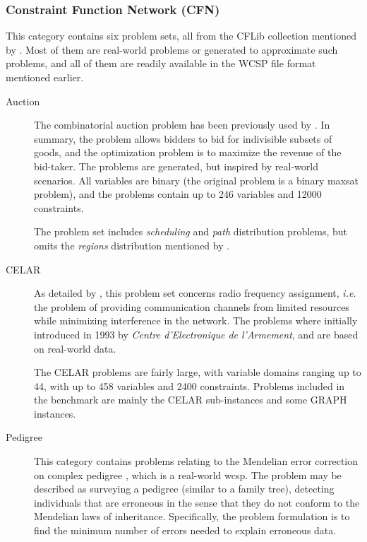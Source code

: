 \subsubsection{Constraint Function Network (CFN)}
This category contains six problem sets, all from the CFLib collection mentioned by \textcite[\pno~3]{deGivry14}.
Most of them are real-world problems or generated to approximate such problems, and all of them are readily available in the \textsc{WCSP} file format mentioned earlier.

\begin{description}
	\item[Auction]
		The combinatorial auction problem has been previously used by \textcites{Larrosa08}{Sandholm99}.
		In summary, the problem allows bidders to bid for indivisible subsets of goods, and the optimization problem is to maximize the revenue of the bid-taker.
		The problems are generated, but inspired by real-world scenarios.
		All variables are binary (the original problem is a binary \gls{maxsat} problem), and the problems contain up to \num{246} variables and \num{12000} constraints.

		The problem set includes \emph{scheduling} and \emph{path} distribution problems, but omits the \emph{regions} distribution mentioned by \textcite[\pno~228]{Larrosa08}.

	\item[CELAR]
		As detailed by \textcite{Cabon99} \parencite[and to some extent][\pno~315\psq]{Meseguer06}, this problem set concerns radio frequency assignment, \emph{i.e.} the problem of providing communication channels from limited resources while minimizing interference in the network.
		The problems where initially introduced in 1993 by \emph{Centre d’Electronique de l’Armement}, and are based on real-world data.

		The CELAR problems are fairly large, with variable domains ranging up to \num{44}, with up to \num{458} variables and \num{2400} constraints.
		Problems included in the benchmark are mainly the CELAR sub-instances \parencite[\pno~85]{Cabon99} and some GRAPH instances.

	\item[Pedigree]
		This category contains problems relating to the Mendelian error correction on complex pedigree \parencites{Sanchez08}[\pno~317\psq]{Meseguer06}, which is a real-world \gls{wcsp}.
		The problem may be described as surveying a pedigree (similar to a family tree), detecting individuals that are erroneous in the sense that they do not conform to the Mendelian laws of inheritance.
		Specifically, the problem formulation is to find the minimum number of errors needed to explain erroneous data.


\end{description}
